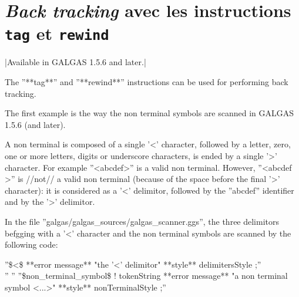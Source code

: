 \section{\emph{Back tracking} avec les instructions \texttt{tag} et \texttt{rewind}}

|Available in GALGAS 1.5.6 and later.|

The ''**tag**'' and ''**rewind**'' instructions can be used for performing back tracking.

The first example is the way the non terminal symbols are scanned in GALGAS 1.5.6 (and later).

A non terminal is composed of a single '<' character, followed by a letter, zero, one or more letters, digits or underscore characters, is ended by a single '>' character. For example ''<abcdef>'' is a valid non terminal. However, ''<abcdef >'' is //not// a valid non terminal (because of the space before the final '>' character): it is considered as a '<' delimitor, followed by the ''abcdef'' identifier and by the '>' delimitor.

In the file ''galgas/galgas\_sources/galgas\_scanner.ggs'', the three delimitors befgging with a '<' character and the non terminal symbols are scanned by the following code:

''\$<\$ **error message** "the '<' delimitor" **style** delimitersStyle ;''\\
''%
''%
''\$non\_terminal\_symbol\$ ! tokenString **error message** "a non terminal symbol <...>" **style** nonTerminalStyle ;''\\

